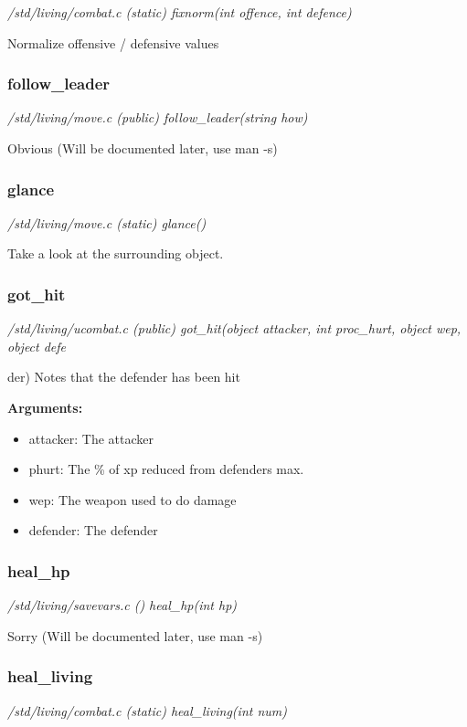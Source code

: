 {\em /std/living/combat.c (static) fixnorm(int offence, int defence)}

Normalize offensive / defensive values


\subsubsection{follow\_leader}

{\em /std/living/move.c (public) follow\_leader(string how)}

Obvious (Will be documented later, use man -s)


\subsubsection{glance}

{\em /std/living/move.c (static) glance()}

Take a look at the surrounding object.


\subsubsection{got\_hit}

{\em /std/living/ucombat.c (public) got\_hit(object attacker, int proc\_hurt, object wep, object defe}

der)
Notes that the defender has been hit

{\bf Arguments:}
\begin{itemize}
\item     attacker: The attacker
\item phurt:    The \% of xp reduced from defenders max.
\item wep:      The weapon used to do damage
\item defender: The defender
\end{itemize}


\subsubsection{heal\_hp}

{\em /std/living/savevars.c () heal\_hp(int hp)}

Sorry (Will be documented later, use man -s)


\subsubsection{heal\_living}

{\em /std/living/combat.c (static) heal\_living(int num)}

